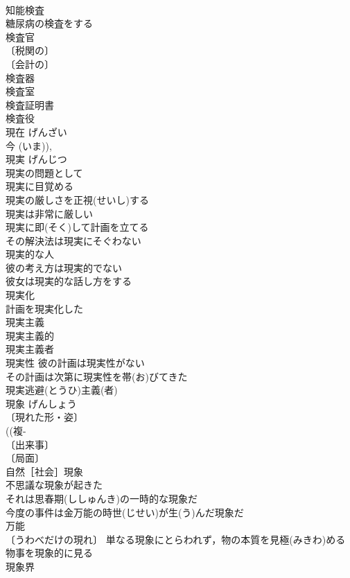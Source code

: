 \documentclass[8pt]{extreport}
\begin{document}
\begin{CJK}{UTF8}{min}
\\	知能検査 
\\	糖尿病の検査をする 
\\	検査官 
\\	〔税関の〕
\\	〔会計の〕
\\	検査器 
\\	検査室 
\\	検査証明書 
\\	検査役 
\\	現在	げんざい	
\\	今 (いま)), 
\\	現実	げんじつ	
\\	現実の問題として 
\\	現実に目覚める 
\\	現実の厳しさを正視(せいし)する 
\\	現実は非常に厳しい 
\\	現実に即(そく)して計画を立てる 
\\	その解決法は現実にそぐわない 
\\	現実的な人 
\\	彼の考え方は現実的でない 
\\	彼女は現実的な話し方をする 
\\	現実化 
\\	計画を現実化した 
\\	現実主義 
\\	現実主義的 
\\	現実主義者 
\\	現実性 彼の計画は現実性がない 
\\	その計画は次第に現実性を帯(お)びてきた 
\\	現実逃避(とうひ)主義(者) 
\\	現象	げんしょう	
\\	〔現れた形・姿〕
\\	((複-
\\	〔出来事〕
\\	〔局面〕
\\	自然［社会］現象 
\\	不思議な現象が起きた 
\\	それは思春期(ししゅんき)の一時的な現象だ 
\\	今度の事件は金万能の時世(じせい)が生(う)んだ現象だ 
\\	万能 
\\	〔うわべだけの現れ〕 単なる現象にとらわれず，物の本質を見極(みきわ)める 
\\	物事を現象的に見る 
\\	現象界 

\end{CJK}
\end{document}
